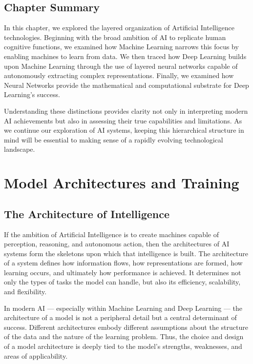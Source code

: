 \documentclass[openany]{book}
\begin{document}
\section{Chapter Summary}

In this chapter, we explored the layered organization of Artificial Intelligence
technologies. Beginning with the broad ambition of AI to replicate human 
cognitive functions, we examined how Machine Learning narrows this focus by 
enabling machines to learn from data. We then traced how Deep Learning builds 
upon Machine Learning through the use of layered neural networks capable of 
autonomously extracting complex representations. Finally, we examined how 
Neural Networks provide the mathematical and computational substrate for Deep 
Learning's success.

Understanding these distinctions provides clarity not only in interpreting 
modern AI achievements but also in assessing their true capabilities and 
limitations. As we continue our exploration of AI systems, keeping this 
hierarchical structure in mind will be essential to making sense of a 
rapidly evolving technological landscape.

\chapter{Model Architectures and Training}

\section{The Architecture of Intelligence}

If the ambition of Artificial Intelligence is to create machines capable of 
perception, reasoning, and autonomous action, then the architectures of AI 
systems form the skeletons upon which that intelligence is built. The 
architecture of a system defines how information flows, how representations are 
formed, how learning occurs, and ultimately how performance is achieved. It 
determines not only the types of tasks the model can handle, but also its 
efficiency, scalability, and flexibility.

In modern AI — especially within Machine Learning and Deep Learning — the 
architecture of a model is not a peripheral detail but a central determinant of 
success. Different architectures embody different assumptions about the 
structure of the data and the nature of the learning problem. Thus, the choice 
and design of a model architecture is deeply tied to the model's strengths, 
weaknesses, and areas of applicability.
\end{document}
